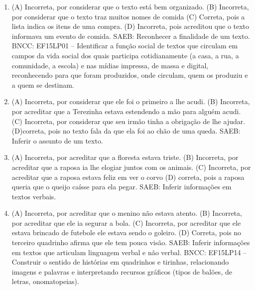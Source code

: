 \begin{enumerate}
\item
(A) Incorreta, por considerar que o texto está bem organizado.
(B) Incorreta, por considerar que o texto traz muitos nomes de comida
(C) Correta, pois a lista indica os itens de uma compra.
(D) Incorreta, pois acreditou que o texto informava um evento de comida.
SAEB: Reconhecer a finalidade de um texto.
BNCC: EF15LP01 -- Identificar a função social de textos que
circulam em campos da vida social dos quais participa cotidianamente (a
casa, a rua, a comunidade, a escola) e nas mídias impressa, de massa e
digital, reconhecendo para que foram produzidos, onde circulam, quem os
produziu e a quem se destinam.

\item
(A) Incorreta, por considerar que ele foi o primeiro a lhe acudi.
(B) Incorreta, por acreditar que a Terezinha estava estendendo a mão
para alguém acudi.
(C) Incorreta, por considerar que seu irmão tinha a obrigação de lhe
ajudar.
(D)correta, pois no texto fala da que ela foi ao chão de uma queda.
SAEB: Inferir o assunto de um texto.

\item
(A) Incorreta, por acreditar que a floresta estava triste.
(B) Incorreta, por acreditar que a raposa ia lhe elogiar juntos com os
animais.
(C) Incorreta, por acreditar que a raposa estava feliz em ver o corvo
(D) correta, pois a raposa queria que o queijo caísse para ela
pegar.
SAEB: Inferir informações em textos verbais.

\item
(A) Incorreta, por acreditar que o menino não estava atento.
(B) Incorreta, por acreditar que ele ia segurar a bola.
(C) Incorreta, por acreditar que ele estava brincado de futebole ele
estava sendo o goleiro.
(D) Correta, pois no terceiro quadrinho afirma que ele tem pouca visão.
SAEB: Inferir informações em textos que articulam linguagem
verbal e não verbal.
BNCC: EF15LP14 -- Construir o sentido de histórias em
quadrinhos e tirinhas, relacionando imagens e palavras e interpretando
recursos gráficos (tipos de balões, de letras, onomatopeias).
\end{enumerate}


